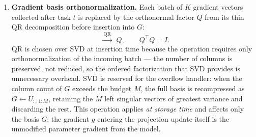 \begin{enumerate}
    \item \textbf{Gradient basis orthonormalization.}
        Each batch of $K$ gradient vectors collected after task $t$ is
        replaced by the orthonormal factor $Q$ from its thin QR
        decomposition before insertion into $G$:
        \begin{equation}
            [g_{t,1} \mid \cdots \mid g_{t,K}]
            \;\xrightarrow{\;\mathrm{QR}\;}\; Q,
            \qquad Q^\top Q = I.
        \end{equation}
        QR is chosen over SVD at insertion time because the operation
        requires only orthonormalization of the incoming batch --- the
        number of columns is preserved, not reduced, so the ordered
        factorization that SVD provides is unnecessary overhead.
        SVD is reserved for the overflow handler: when the column count
        of $G$ exceeds the budget $M$, the full basis is recompressed as
        $G \leftarrow U_{:,\,1:M}$, retaining the $M$ left singular
        vectors of greatest variance and discarding the rest.
        This operation applies \emph{at storage time} and affects only
        the basis $G$; the gradient $g$ entering the projection update
        itself is the unmodified parameter gradient from the model.


\end{enumerate}
